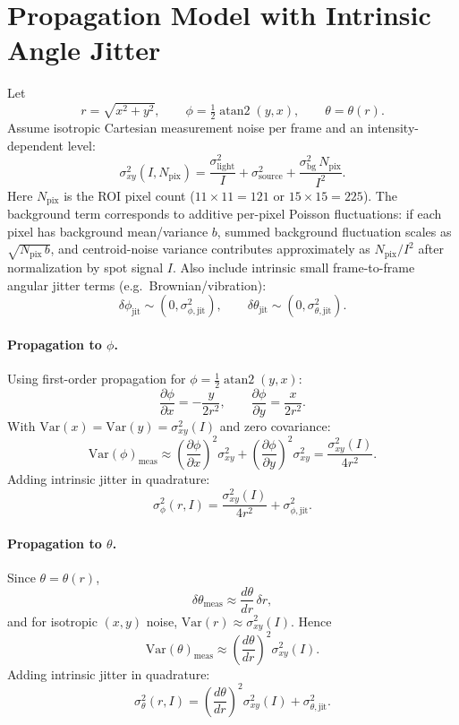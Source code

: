 \documentclass[11pt]{article}
\begin{document}
\section*{Propagation Model with Intrinsic Angle Jitter}
Let
\[
r=\sqrt{x^2+y^2},\qquad
\phi=\tfrac12\operatorname{atan2}(y,x),\qquad
\theta=\theta(r).
\]
Assume isotropic Cartesian measurement noise per frame and an intensity-dependent level:
\[
\sigma_{xy}^2(I,N_{\text{pix}})
=
\frac{\sigma_{\text{light}}^2}{I}
+
\sigma_{\text{source}}^2
+
\frac{\sigma_{\text{bg}}^2\,N_{\text{pix}}}{I^2}.
\]
Here \(N_{\text{pix}}\) is the ROI pixel count (\(11\times 11=121\) or \(15\times 15=225\)).
The background term corresponds to additive per-pixel Poisson fluctuations:
if each pixel has background mean/variance \(b\), summed background fluctuation scales as
\(\sqrt{N_{\text{pix}}\,b}\), and centroid-noise variance contributes approximately as
\(N_{\text{pix}}/I^2\) after normalization by spot signal \(I\).
Also include intrinsic small frame-to-frame angular jitter terms (e.g.\ Brownian/vibration):
\[
\delta\phi_{\text{jit}}\sim(0,\sigma_{\phi,\text{jit}}^2),\qquad
\delta\theta_{\text{jit}}\sim(0,\sigma_{\theta,\text{jit}}^2).
\]

\paragraph{Propagation to \(\phi\).}
Using first-order propagation for \(\phi=\tfrac12\operatorname{atan2}(y,x)\):
\[
\frac{\partial\phi}{\partial x}=-\frac{y}{2r^2},\qquad
\frac{\partial\phi}{\partial y}=\frac{x}{2r^2}.
\]
With \(\mathrm{Var}(x)=\mathrm{Var}(y)=\sigma_{xy}^2(I)\) and zero covariance:
\[
\mathrm{Var}(\phi)_{\text{meas}}
\approx
\left(\frac{\partial\phi}{\partial x}\right)^2\sigma_{xy}^2
+
\left(\frac{\partial\phi}{\partial y}\right)^2\sigma_{xy}^2
=
\frac{\sigma_{xy}^2(I)}{4r^2}.
\]
Adding intrinsic jitter in quadrature:
\[
\sigma_\phi^2(r,I)=\frac{\sigma_{xy}^2(I)}{4r^2}+\sigma_{\phi,\text{jit}}^2.
\]

\paragraph{Propagation to \(\theta\).}
Since \(\theta=\theta(r)\),
\[
\delta\theta_{\text{meas}}\approx \frac{d\theta}{dr}\,\delta r,
\]
and for isotropic \((x,y)\) noise, \(\mathrm{Var}(r)\approx \sigma_{xy}^2(I)\). Hence
\[
\mathrm{Var}(\theta)_{\text{meas}}
\approx
\left(\frac{d\theta}{dr}\right)^2 \sigma_{xy}^2(I).
\]
Adding intrinsic jitter in quadrature:
\[
\sigma_\theta^2(r,I)=
\left(\frac{d\theta}{dr}\right)^2 \sigma_{xy}^2(I)
+
\sigma_{\theta,\text{jit}}^2.
\]
\end{document}
